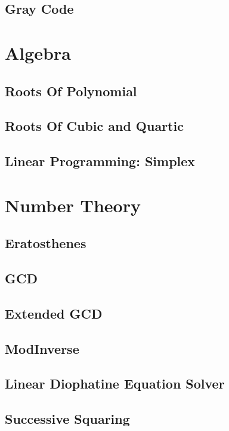 \documentclass{article}
\begin{document}
    \subsection{Gray Code}
        

\section{Algebra}
    \subsection{Roots Of Polynomial}
    \subsection{Roots Of Cubic and Quartic}
    \subsection{Linear Programming: Simplex}

\section{Number Theory}
    \subsection{Eratosthenes}
        
    \subsection{GCD}
        
    \subsection{Extended GCD}
        
    \subsection{ModInverse}
        
    \subsection{Linear Diophatine Equation Solver}
        
    \subsection{Successive Squaring}
        
\end{document}
